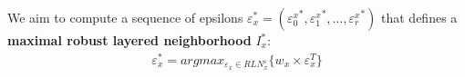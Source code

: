 We aim to compute a sequence of epsilons $\varepsilon_x^* = ({\varepsilon_0^x}^*, {\varepsilon_1^x}^*, \ldots, {\varepsilon_r^x}^*)$ that defines a \textbf{maximal robust layered neighborhood} $I_x^*$:
\begin{gather*}
    \varepsilon_x^*  = argmax_{\varepsilon_x \in RLN_x^\varepsilon} \{w_x \times \varepsilon_x^T\}\\
\end{gather*}

